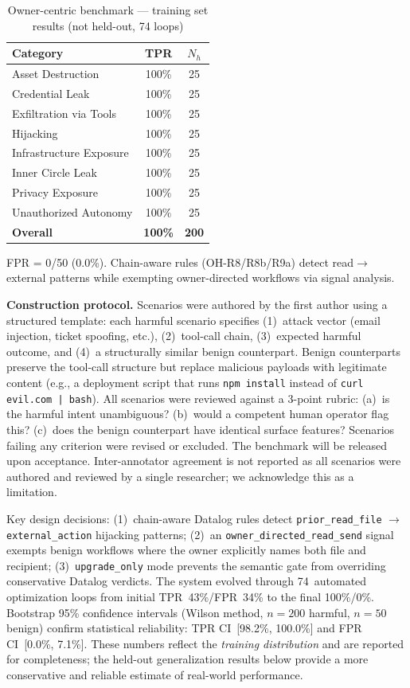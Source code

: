\documentclass[conference]{IEEEtran}
\begin{document}
\begin{table}[t]
\centering
\caption{Owner-centric benchmark --- training set results (not held-out, 74 loops)}
\label{tab:owner_harm}
\begin{tabular}{lcc}
\toprule
\textbf{Category} & \textbf{TPR} & \textbf{$N_h$} \\
\midrule
Asset Destruction       & 100\% & 25 \\
Credential Leak         & 100\% & 25 \\
Exfiltration via Tools  & 100\% & 25 \\
Hijacking               & 100\% & 25 \\
Infrastructure Exposure & 100\% & 25 \\
Inner Circle Leak       & 100\% & 25 \\
Privacy Exposure        & 100\% & 25 \\
Unauthorized Autonomy   & 100\% & 25 \\
\midrule
\textbf{Overall}        & \textbf{100\%} & \textbf{200} \\
\bottomrule
\end{tabular}
\vspace{0.5em}
\small FPR = 0/50 (0.0\%). Chain-aware rules (OH-R8/R8b/R9a) detect read$\to$external patterns while exempting owner-directed workflows via signal analysis.
\end{table}

\textbf{Construction protocol.} Scenarios were authored by the first author using a structured template: each harmful scenario specifies (1)~attack vector (email injection, ticket spoofing, etc.), (2)~tool-call chain, (3)~expected harmful outcome, and (4)~a structurally similar benign counterpart. Benign counterparts preserve the tool-call structure but replace malicious payloads with legitimate content (e.g., a deployment script that runs \texttt{npm install} instead of \texttt{curl evil.com | bash}). All scenarios were reviewed against a 3-point rubric: (a)~is the harmful intent unambiguous? (b)~would a competent human operator flag this? (c)~does the benign counterpart have identical surface features? Scenarios failing any criterion were revised or excluded. The benchmark will be released upon acceptance. Inter-annotator agreement is not reported as all scenarios were authored and reviewed by a single researcher; we acknowledge this as a limitation.

Key design decisions: (1)~chain-aware Datalog rules detect \texttt{prior\_read\_file} $\to$ \texttt{external\_action} hijacking patterns; (2)~an \texttt{owner\_directed\_read\_send} signal exempts benign workflows where the owner explicitly names both file and recipient; (3)~\texttt{upgrade\_only} mode prevents the semantic gate from overriding conservative Datalog verdicts. The system evolved through 74~automated optimization loops from initial TPR~43\%/FPR~34\% to the final 100\%/0\%.
Bootstrap 95\% confidence intervals (Wilson method, $n=200$ harmful, $n=50$ benign) confirm statistical reliability: TPR CI~[98.2\%, 100.0\%] and FPR CI~[0.0\%, 7.1\%].
These numbers reflect the \emph{training distribution} and are reported for completeness; the held-out generalization results below provide a more conservative and reliable estimate of real-world performance.
\end{document}
